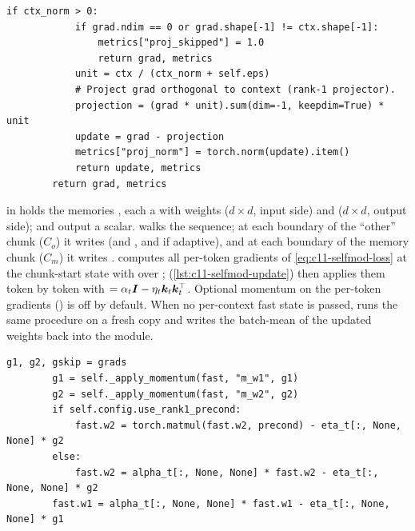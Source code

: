 \begin{lstlisting}[caption={Excerpt from \texttt{repos/\allowbreak kmccleary3301\_\_nested\_learning/\allowbreak src/\allowbreak nested\_learning/\allowbreak optim/\allowbreak deep.py} (\texttt{DeepMomentum.\_nl\_precondition})},label={lst:c11-nlprecond}]
        if ctx_norm > 0:
            if grad.ndim == 0 or grad.shape[-1] != ctx.shape[-1]:
                metrics["proj_skipped"] = 1.0
                return grad, metrics
            unit = ctx / (ctx_norm + self.eps)
            # Project grad orthogonal to context (rank-1 projector).
            projection = (grad * unit).sum(dim=-1, keepdim=True) * unit
            update = grad - projection
            metrics["proj_norm"] = torch.norm(update).item()
            return update, metrics
        return grad, metrics
\end{lstlisting}

\begin{implnote}[title={In the code: self-modifying Titans}]
 in  holds the memories
, each a  with weights
 ($d\times d$, input side) and  ($d\times d$, output side);  and
 output a scalar.  walks the sequence; at each boundary
of the ``other'' chunk ($C_o$) it writes  (and , and  if
adaptive), and at each boundary of the memory chunk ($C_m$) it writes .
 computes all per-token gradients of \cref{eq:c11-selfmod-loss} at the
chunk-start state with  over ; 
(\cref{lst:c11-selfmod-update}) then applies them token by token with
 $= \alpha_t\bm{I} - \eta_t\bm{k}_t\bm{k}_t^{\top}$. Optional momentum on the per-token gradients
() is off by default. When no per-context fast state is passed,
 runs the same procedure on a fresh copy and writes the batch-mean of
the updated weights back into the module.
\end{implnote}

\begin{lstlisting}[caption={Excerpt from \texttt{repos/\allowbreak kmccleary3301\_\_nested\_learning/\allowbreak src/\allowbreak nested\_learning/\allowbreak titan/\allowbreak self\_modifying.py} (\texttt{\_apply\_param\_update}), the update of \cref{eq:c11-selfmod-update}},label={lst:c11-selfmod-update}]
        g1, g2, gskip = grads
        g1 = self._apply_momentum(fast, "m_w1", g1)
        g2 = self._apply_momentum(fast, "m_w2", g2)
        if self.config.use_rank1_precond:
            fast.w2 = torch.matmul(fast.w2, precond) - eta_t[:, None, None] * g2
        else:
            fast.w2 = alpha_t[:, None, None] * fast.w2 - eta_t[:, None, None] * g2
        fast.w1 = alpha_t[:, None, None] * fast.w1 - eta_t[:, None, None] * g1
\end{lstlisting}

